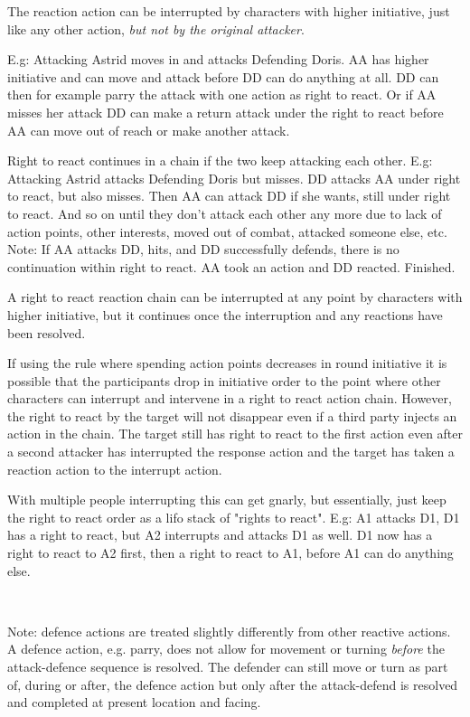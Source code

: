 The reaction action can be interrupted by characters with higher initiative, just like any other action, \emph{but not by the original attacker}.

E.g: Attacking Astrid moves in and attacks Defending Doris. AA has higher initiative and can move and attack before DD can do anything at all. DD can then for example parry the attack with one action as right to react. Or if AA misses her attack DD can make a return attack under the right to react before AA can move out of reach or make another attack.

Right to react continues in a chain if the two keep attacking each other.
E.g: Attacking Astrid attacks Defending Doris but misses. DD attacks AA under right to react, but also misses. Then AA can attack DD if she wants, still under right to react. And so on until they don't attack each other any more due to lack of action points, other interests, moved out of combat, attacked someone else, etc.\\
Note: If AA attacks DD, hits, and DD successfully defends, there is no continuation within right to react. AA took an action and DD reacted. Finished.

A right to react reaction chain can be interrupted at any point by characters with higher initiative, but it continues once the interruption and any reactions have been resolved.

If using the rule where spending action points decreases in round initiative it is possible that the participants drop in initiative order to the point where other characters can interrupt and intervene in a right to react action chain. However, the right to react by the target will not disappear even if a third party injects an action in the chain. The target still has right to react to the first action even after a second attacker has interrupted the response action and the target has taken a reaction action to the interrupt action.

With multiple people interrupting this can get gnarly, but essentially, just keep the right to react order as a lifo stack of "rights to react". E.g: A1 attacks D1, D1 has a right to react, but A2 interrupts and attacks D1 as well. D1 now has a right to react to A2 first, then a right to react to A1, before A1 can do anything else.

\

Note: defence actions are treated slightly differently from other reactive actions. A defence action, e.g. parry, does not allow for movement or turning \emph{before} the attack-defence sequence is resolved. The defender can still move or turn as part of, during or after, the defence action but only after the attack-defend is resolved and completed at present location and facing.

